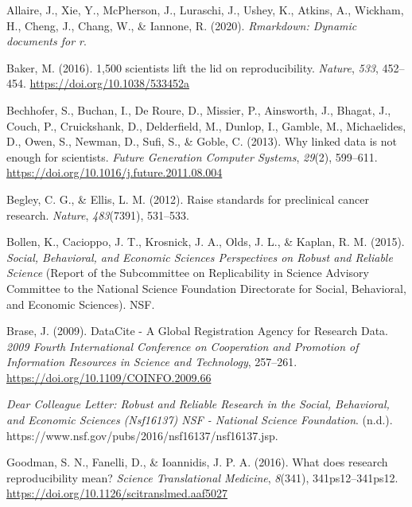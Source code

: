\documentclass[
  a4paper,
]{article}
\newlength{\cslhangindent}
\newenvironment{CSLReferences}[2] %
 {\begin{list}{}{%
  \setlength{\itemindent}{0pt}
  \setlength{\leftmargin}{0pt}
  \setlength{\parsep}{0pt}
  \ifodd #1
   \setlength{\leftmargin}{\cslhangindent}
   \setlength{\itemindent}{-1\cslhangindent}
  \fi
  \setlength{\itemsep}{#2\baselineskip}}}
 {\end{list}}
\begin{document}
\label{refs}
\begin{CSLReferences}{1}{0}
Allaire, J., Xie, Y., McPherson, J., Luraschi, J., Ushey, K., Atkins,
A., Wickham, H., Cheng, J., Chang, W., \& Iannone, R. (2020).
\emph{Rmarkdown: {Dynamic} documents for r}.

Baker, M. (2016). 1,500 scientists lift the lid on reproducibility.
\emph{Nature}, \emph{533}, 452--454.
\url{https://doi.org/10.1038/533452a}

Bechhofer, S., Buchan, I., De Roure, D., Missier, P., Ainsworth, J.,
Bhagat, J., Couch, P., Cruickshank, D., Delderfield, M., Dunlop, I.,
Gamble, M., Michaelides, D., Owen, S., Newman, D., Sufi, S., \& Goble,
C. (2013). Why linked data is not enough for scientists. \emph{Future
Generation Computer Systems}, \emph{29}(2), 599--611.
\url{https://doi.org/10.1016/j.future.2011.08.004}

Begley, C. G., \& Ellis, L. M. (2012). Raise standards for preclinical
cancer research. \emph{Nature}, \emph{483}(7391), 531--533.

Bollen, K., Cacioppo, J. T., Krosnick, J. A., Olds, J. L., \& Kaplan, R.
M. (2015). \emph{Social, {Behavioral}, and {Economic Sciences
Perspectives} on {Robust} and {Reliable Science}} (Report of the
Subcommittee on Replicability in Science Advisory Committee to the
National Science Foundation Directorate for Social, Behavioral, and
Economic Sciences). {NSF}.

Brase, J. (2009). {DataCite} - {A Global Registration Agency} for
{Research Data}. \emph{2009 {Fourth International Conference} on
{Cooperation} and {Promotion} of {Information Resources} in {Science}
and {Technology}}, 257--261.
\url{https://doi.org/10.1109/COINFO.2009.66}

\emph{Dear {Colleague Letter}: {Robust} and {Reliable Research} in the
{Social}, {Behavioral}, and {Economic Sciences} (Nsf16137) \textbar{}
{NSF} - {National Science Foundation}}. (n.d.).
https://www.nsf.gov/pubs/2016/nsf16137/nsf16137.jsp.

Goodman, S. N., Fanelli, D., \& Ioannidis, J. P. A. (2016). What does
research reproducibility mean? \emph{Science Translational Medicine},
\emph{8}(341), 341ps12--341ps12.
\url{https://doi.org/10.1126/scitranslmed.aaf5027}


\end{CSLReferences}
\end{document}
